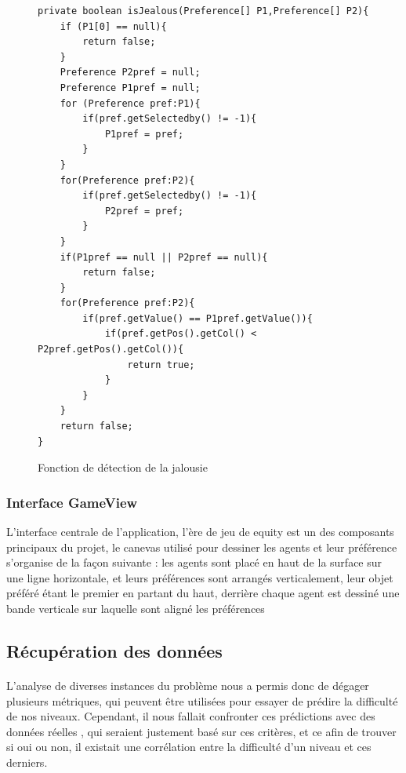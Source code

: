 \documentclass[../main.tex]{subfiles}
\begin{document}
\begin{figure}[ht!]
\begin{lstlisting}
private boolean isJealous(Preference[] P1,Preference[] P2){
    if (P1[0] == null){
        return false;
    }
    Preference P2pref = null;
    Preference P1pref = null;
    for (Preference pref:P1){
        if(pref.getSelectedby() != -1){
            P1pref = pref;
        }
    }
    for(Preference pref:P2){
        if(pref.getSelectedby() != -1){
            P2pref = pref;
        }
    }
    if(P1pref == null || P2pref == null){
        return false;
    }
    for(Preference pref:P2){
        if(pref.getValue() == P1pref.getValue()){
            if(pref.getPos().getCol() < P2pref.getPos().getCol()){
                return true;
            }
        }
    }
    return false;
}
\end{lstlisting}
\caption{Fonction de détection de la jalousie}
\label{detection-jalousie}
\end{figure}

	


	\subsubsection{Interface GameView}
	
L'interface centrale de  l'application, l'ère de jeu de equity est un des composants principaux du projet, le canevas utilisé pour dessiner les agents et leur préférence s'organise de la façon suivante : les agents sont placé en haut de la surface sur une ligne horizontale, et leurs préférences sont arrangés verticalement, leur objet préféré étant le premier en partant du haut, derrière chaque agent est dessiné une bande verticale sur laquelle sont aligné les préférences 


	\subsection{Récupération des données}
	
	\paragraph{}
	L’analyse de diverses instances du problème nous a permis donc de dégager plusieurs métriques, qui peuvent être utilisées pour essayer de prédire la difficulté de nos niveaux. Cependant, il nous fallait confronter ces prédictions avec des données réelles , qui seraient justement basé sur ces critères, et ce afin de trouver si oui ou non, il existait une corrélation entre la difficulté d’un niveau et ces derniers. 
\end{document}
